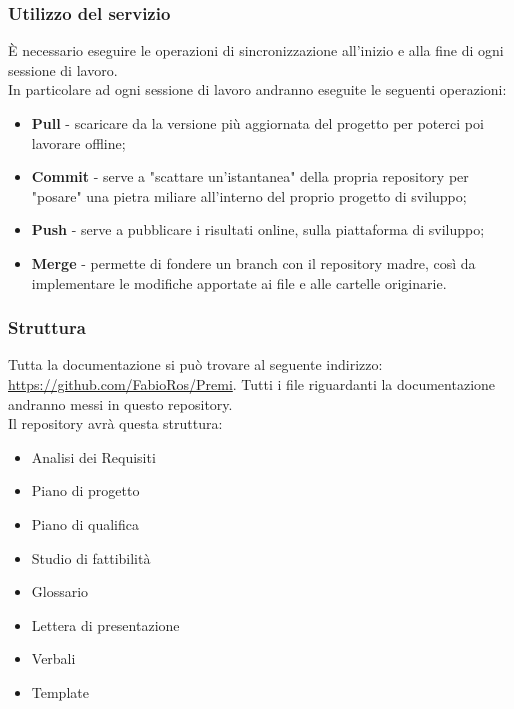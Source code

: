 		\subsubsection{Utilizzo del servizio}
È necessario eseguire le operazioni di sincronizzazione all'inizio e alla fine di ogni sessione di lavoro. \\
In particolare ad ogni sessione di lavoro andranno eseguite le seguenti operazioni:
\begin{itemize}
	\item \textbf{Pull} - scaricare da la versione più aggiornata del progetto per poterci poi lavorare offline;
	\item \textbf{Commit} - serve a "scattare un'istantanea" della propria \gls{repository} per "posare" una pietra miliare all'interno del proprio progetto di sviluppo;
	\item \textbf{Push} - serve a pubblicare i risultati online, sulla piattaforma di sviluppo;
	\item \textbf{Merge} - permette di fondere un \gls{branch} con il \gls{repository} madre, così da implementare le modifiche apportate ai file e alle cartelle originarie.
\end{itemize}

		\subsubsection{Struttura}
Tutta la documentazione si può trovare al seguente indirizzo: \url{https://github.com/FabioRos/Premi}. Tutti i file riguardanti la documentazione andranno messi in questo \gls{repository}. \\
Il \gls{repository} avrà questa struttura:
\begin{itemize}
	\item Analisi dei Requisiti
	\item Piano di progetto
	\item Piano di qualifica
	\item Studio di fattibilità
	\item Glossario
	\item Lettera di presentazione
	\item Verbali
	\item Template
\end{itemize}

